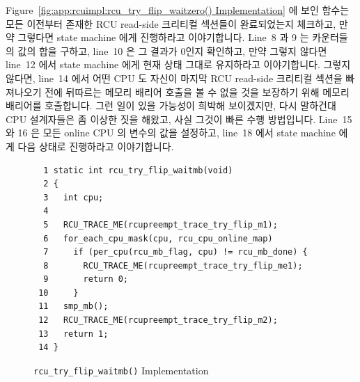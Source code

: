 Figure~\ref{fig:app:rcuimpl:rcu_try_flip_waitzero() Implementation}
에 보인  함수는 모든 이전부터 존재한 RCU read-side
크리티컬 섹션들이 완료되었는지 체크하고, 만약 그렇다면 state machine 에게
진행하라고 이야기합니다.
Line~8 과 9 는 카운터들의 값의 합을 구하고, line~10 은 그 결과가 0인지
확인하고, 만약 그렇지 않다면 line~12 에서 state machine 에게 현재 상태 그대로
유지하라고 이야기합니다.
그렇지 않다면, line~14 에서 어떤 CPU 도 자신이 마지막 RCU read-side 크리티컬
섹션을 빠져나오기 전에 뒤따르는 메모리 배리어 호출을 볼 수 없을 것을 보장하기
위해 메모리 배리어를 호출합니다.
그런 일이 있을 가능성이 희박해 보이겠지만, 다시 말하건대 CPU 설계자들은 좀
이상한 짓을 해왔고, 사실 그것이 빠른 수행 방법입니다.
Line~15 와 16 은 모든 online CPU 의  변수의 값을 설정하고,
line~18 에서 state machine 에게 다음 상태로 진행하라고 이야기합니다.

\begin{figure}[tbp]
{ \scriptsize
\begin{verbatim}
  1 static int rcu_try_flip_waitmb(void)
  2 {
  3   int cpu;
  4
  5   RCU_TRACE_ME(rcupreempt_trace_try_flip_m1);
  6   for_each_cpu_mask(cpu, rcu_cpu_online_map)
  7     if (per_cpu(rcu_mb_flag, cpu) != rcu_mb_done) {
  8       RCU_TRACE_ME(rcupreempt_trace_try_flip_me1);
  9       return 0;
 10     }
 11   smp_mb();
 12   RCU_TRACE_ME(rcupreempt_trace_try_flip_m2);
 13   return 1;
 14 }
\end{verbatim}
}
\caption{{\tt rcu\_try\_flip\_waitmb()} Implementation}
\label{fig:app:rcuimpl:rcu_try_flip_waitmb() Implementation}
\end{figure}


